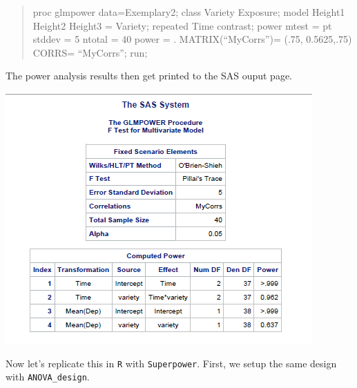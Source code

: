 \documentclass[]{book}
\begin{document}
\begin{quote}
proc glmpower data=Exemplary2;
class Variety Exposure;
model Height1 Height2 Height3 = Variety;
repeated Time contrast;
power
mtest = pt
stddev = 5
ntotal = 40
power = .
MATRIX(``MyCorrs'')= (.75,
0.5625,.75)
CORRS= ``MyCorrs'';
run;
\end{quote}

The power analysis results then get printed to the SAS ouput page.

\includegraphics{screenshots/sas_2x3repeated.png}

Now let's replicate this in \texttt{R} with \texttt{Superpower}. First, we setup the same design with \texttt{ANOVA\_design}.
\end{document}

